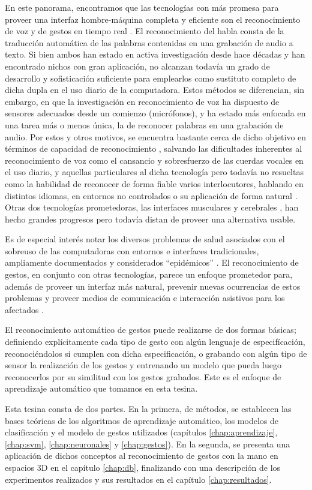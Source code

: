 En este panorama, encontramos que las tecnologías con más promesa para proveer una interfaz hombre-máquina completa y eficiente son el reconocimiento de voz y de gestos en tiempo real \cite{Jain2011}. El reconocimiento del habla consta de la traducción automática de las palabras contenidas en una grabación de audio a texto. Si bien ambos han estado en activa investigación desde hace décadas \cite{madeira1978,myers1998,juang2005} y han encontrado nichos con gran aplicación, no alcanzan todavía un grado de desarrollo y sofisticación suficiente para emplearlos como sustituto completo de dicha dupla en el uso diario de la computadora. Estos métodos se diferencian, sin embargo, en que la investigación en reconocimiento de voz ha dispuesto de sensores adecuados desde un comienzo (micrófonos), y ha estado más enfocada en una tarea más o menos única, la de reconocer palabras en una grabación de audio. Por estos y otros motivos, se encuentra bastante cerca de dicho objetivo en términos de capacidad de reconocimiento \cite{anusuya2010,schalkwyk2010,hinton2012}, salvando las dificultades inherentes al reconocimiento de voz como el cansancio y sobresfuerzo de las cuerdas vocales en el uso diario, y aquellas particulares al dicha tecnología pero todavía no resueltas como la habilidad de reconocer de forma fiable varios interlocutores, hablando en distintos idiomas, en entornos no controlados \cite{Rashmi2013,heigold2013} o su aplicación de forma natural \cite{deng2004}. Otras dos tecnologías prometedoras, las interfaces musculares \cite{chowdhury2013} y cerebrales \cite{lebedev2006,millan2013}, han hecho grandes progresos pero todavía distan de proveer una alternativa usable.

Es de especial interés notar los diversos problemas de salud asociados con el sobreuso de las computadoras con entornos e interfaces tradicionales, ampliamente documentados y considerados ``epidémicos'' \cite{kiesler1988,keller1998,epstein2012,saroshe2012,Coggon2013}. El reconocimiento de gestos, en conjunto con otras tecnologías, parece un enfoque prometedor para, además de proveer un interfaz más natural, prevenir nuevas ocurrencias de estos problemas y proveer medios de comunicación e interacción asistivos para los afectados \cite{chen2009,Perera2005}. 

El reconocimiento automático de gestos puede realizarse de dos formas básicas; definiendo explícitamente cada tipo de gesto con algún lenguaje de especifícación, reconociéndolos si cumplen con dicha especificación, o grabando con algún tipo de sensor la realización de los gestos y entrenando un modelo que pueda luego reconocerlos por su similitud con los gestos grabados. Este es el enfoque de aprendizaje automático que tomamos en esta tesina.

Esta tesina consta de dos partes. En la primera, de métodos, se establecen las bases teóricas de los algoritmos de aprendizaje automático, los modelos de clasificación  y el modelo de gestos utilizados (capítulos \ref{chap:aprendizaje}, \ref{chap:svm}, \ref{chap:neuronales} y \ref{chap:gestos}). En la segunda, se presenta una aplicación de dichos conceptos al reconocimiento de gestos con la mano en espacios 3D en el capítulo \ref{chap:db}, finalizando con una descripción de los experimentos realizados y sus resultados en el capítulo \ref{chap:resultados}.
